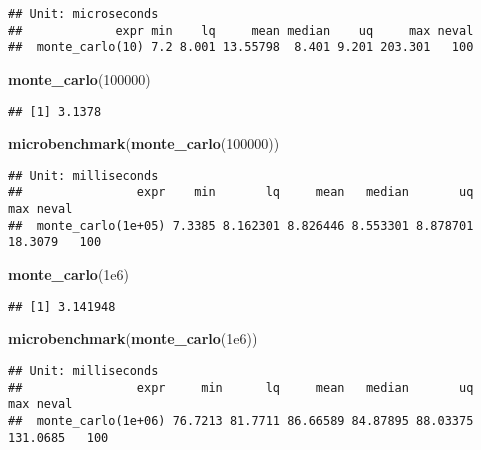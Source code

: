 \documentclass[
]{article}
\newenvironment{Shaded}{\begin{snugshade}}{\end{snugshade}}
\newcommand{\DecValTok}[1]{\textcolor[rgb]{0.00,0.00,0.81}{#1}}
\newcommand{\FloatTok}[1]{\textcolor[rgb]{0.00,0.00,0.81}{#1}}
\newcommand{\KeywordTok}[1]{\textcolor[rgb]{0.13,0.29,0.53}{\textbf{#1}}}
\newcommand{\NormalTok}[1]{#1}
\begin{document}
\begin{verbatim}
## Unit: microseconds
##             expr min    lq     mean median    uq     max neval
##  monte_carlo(10) 7.2 8.001 13.55798  8.401 9.201 203.301   100
\end{verbatim}

\begin{Shaded}
\begin{Highlighting}[]
\KeywordTok{monte\_carlo}\NormalTok{(}\DecValTok{100000}\NormalTok{)}
\end{Highlighting}
\end{Shaded}

\begin{verbatim}
## [1] 3.1378
\end{verbatim}

\begin{Shaded}
\begin{Highlighting}[]
\KeywordTok{microbenchmark}\NormalTok{(}\KeywordTok{monte\_carlo}\NormalTok{(}\DecValTok{100000}\NormalTok{))}
\end{Highlighting}
\end{Shaded}

\begin{verbatim}
## Unit: milliseconds
##                expr    min       lq     mean   median       uq     max neval
##  monte_carlo(1e+05) 7.3385 8.162301 8.826446 8.553301 8.878701 18.3079   100
\end{verbatim}

\begin{Shaded}
\begin{Highlighting}[]
\KeywordTok{monte\_carlo}\NormalTok{(}\FloatTok{1e6}\NormalTok{)}
\end{Highlighting}
\end{Shaded}

\begin{verbatim}
## [1] 3.141948
\end{verbatim}

\begin{Shaded}
\begin{Highlighting}[]
\KeywordTok{microbenchmark}\NormalTok{(}\KeywordTok{monte\_carlo}\NormalTok{(}\FloatTok{1e6}\NormalTok{))}
\end{Highlighting}
\end{Shaded}

\begin{verbatim}
## Unit: milliseconds
##                expr     min      lq     mean   median       uq      max neval
##  monte_carlo(1e+06) 76.7213 81.7711 86.66589 84.87895 88.03375 131.0685   100
\end{verbatim}
\end{document}
